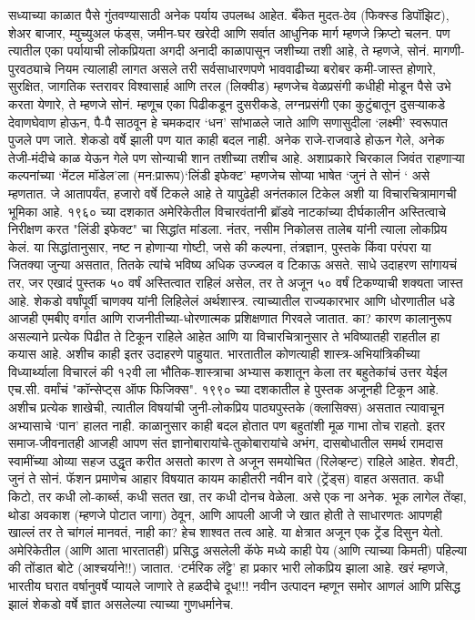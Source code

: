 सध्याच्या काळात पैसे गुंतवण्यासाठी अनेक पर्याय उपलब्ध आहेत. बँकेत मुदत-ठेव (फिक्स्ड डिपॉझिट), शेअर बाजार, म्युच्युअल फंड्स, जमीन-घर खरेदी आणि सर्वात आधुनिक मार्ग म्हणजे क्रिप्टो चलन. पण त्यातील एका पर्यायाची लोकप्रियता अगदी अनादी काळापासून जशीच्या तशी आहे, ते म्हणजे, सोनं. मागणी-पुरवठ्याचे नियम त्यालाही लागत असले तरी सर्वसाधारणपणे भाववाढीच्या बरोबर कमी-जास्त होणारे, सुरक्षित, जागतिक स्तरावर विश्वासार्ह आणि तरल (लिक्वीड) म्हणजेच वेळप्रसंगी कधीही मोडून पैसे उभे करता येणारे, ते म्हणजे सोनं. म्हणूच एका पिढीकडून दुसरीकडे, लग्नप्रसंगी एका कुटुंबातून दुसऱ्याकडे देवाणघेवाण होऊन, पै-पै साठवून हे चमकदार ‘धन’ सांभाळले जाते आणि सणासुदीला ‘लक्ष्मी’ स्वरूपात पुजले पण जाते. शेकडो वर्षे झाली पण यात काही बदल नाही. अनेक राजे-राजवाडे होऊन गेले, अनेक तेजी-मंदीचे काळ येऊन गेले पण सोन्याची शान तशीच्या तशीच आहे. अशाप्रकारे चिरकाल जिवंत राहणाऱ्या कल्पनांच्या ‘मेंटल मॉडेल’ला (मन:प्रारूप)‘लिंडी इफेक्ट’ म्हणजेच सोप्या भाषेत ‘जुनं ते सोनं ‘ असे म्हणतात. जे आतापर्यंत, हजारो वर्षे टिकले आहे ते यापुढेही अनंतकाल टिकेल अशी या विचारचित्रामागची भूमिका आहे. 
१९६० च्या दशकात अमेरिकेतील विचारवंतांनी ब्रॉडवे नाटकांच्या दीर्घकालीन अस्तित्वाचे निरीक्षण करत "लिंडी इफेक्ट" चा सिद्धांत मांडला. नंतर, नसीम निकोलस तालेब यांनी त्याला लोकप्रिय केलं. या सिद्धांतानुसार, नष्ट न होणाऱ्या गोष्टी, जसे की कल्पना, तंत्रज्ञान, पुस्तके किंवा परंपरा या जितक्या जुन्या असतात, तितके त्यांचे भविष्य अधिक उज्ज्वल व टिकाऊ असते. साधे उदाहरण सांगायचं तर, जर एखादं पुस्तक ५० वर्षं अस्तित्वात राहिलं असेल, तर ते अजून ५० वर्षं टिकण्याची शक्यता जास्त आहे. शेकडो वर्षांपूर्वी चाणक्य यांनी लिहिलेलं अर्थशास्त्र. त्याच्यातील राज्यकारभार आणि धोरणातील धडे आजही एमबीए वर्गात आणि राजनीतीच्या-धोरणात्मक प्रशिक्षणात गिरवले जातात. का? कारण कालानुरूप असल्याने प्रत्येक पिढीत ते टिकून राहिले आहेत आणि या विचारचित्रानुसार ते भविष्यातही राहतील हा कयास आहे. अशीच काही इतर उदाहरणे पाहुयात. 
भारतातील कोणत्याही शास्त्र-अभियांत्रिकीच्या विध्यार्थ्याला विचारलं की १२वी ला भौतिक-शास्त्राचा अभ्यास कशातून केला तर बहुतेकांचं उत्तर येईल एच.सी. वर्मांचं "कॉन्सेप्ट्स ऑफ फिजिक्स". १९९० च्या दशकातील हे पुस्तक अजूनही टिकून आहे. अशीच प्रत्येक शाखेची, त्यातील विषयांची जुनी-लोकप्रिय पाठ्यपुस्तके (क्लासिक्स) असतात त्यावाचून अभ्यासाचे ‘पान’ हालत नाही. काळानुसार काही बदल होतात पण बहुतांशी मूळ गाभा तोच राहतो. इतर समाज-जीवनातही आजही आपण संत ज्ञानोबारायांचे-तुकोबारायांचे अभंग, दासबोधातील समर्थ रामदास स्वामींच्या ओव्या सहज उद्धृत करीत असतो कारण ते अजून समयोचित (रिलेव्हन्ट) राहिले आहेत. शेवटी, जुनं ते सोनं. 
फॅशन प्रमाणेच आहार विषयात कायम काहीतरी नवीन वारे (ट्रेंड्स) वाहत असतात. कधी किटो, तर कधी लो-कार्ब्स, कधी सतत खा, तर कधी दोनच वेळेला. असे एक ना अनेक. भूक लागेल तेंव्हा, थोडा अवकाश (म्हणजे पोटात जागा) ठेवून, आणि आपली आजी जे खात होती ते साधारणतः आपणही खाल्लं तर ते चांगलं मानवतं, नाही का? हेच शाश्वत तत्व आहे. या क्षेत्रात अजून एक ट्रेंड दिसुन येतो. अमेरिकेतील (आणि आता भारतातही) प्रसिद्ध असलेली कॅफे मध्ये काही पेय (आणि त्याच्या किमती) पहिल्या की तोंडात बोटे (आश्चर्याने!!) जातात. ‘टर्मरिक लॅट्टे’ हा प्रकार भारी लोकप्रिय झाला आहे. खरं म्हणजे, भारतीय घरात वर्षानुवर्षे प्यायले जाणारे ते हळदीचे दूध!!! नवीन उत्पादन म्हणून समोर आणलं आणि प्रसिद्ध झालं शेकडो वर्षे ज्ञात असलेल्या त्याच्या गुणधर्मानेच. 
